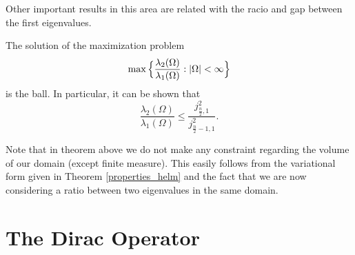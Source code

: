 Other important results in this area are related with the racio and gap between the first eigenvalues.
\begin{theorem}
    The solution of the maximization problem
    \[
    \max \Big\{\frac{\lambda_2(\Omega)}{\lambda_1(\Omega)}: \abs{\Omega} < \infty \Big\}
    \]
    is the ball. In particular, it can be shown that
    \[
    \frac{\lambda_2(\Omega)}{\lambda_1(\Omega)}  \leq \frac{j_{\frac{n}{2},1}^2}{j_{\frac{n}{2}-1,1}^2}.
    \]
\end{theorem}

\begin{remark}
    Note that in theorem above we do not make any constraint regarding the volume of our domain (except finite measure). This easily follows from the variational form given in Theorem \ref*{properties_helm} and the fact that we are now considering a ratio between two eigenvalues in the same domain.
\end{remark}


\section{The Dirac Operator}
 
